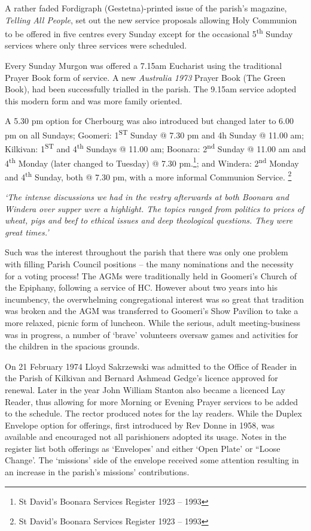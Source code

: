 A rather faded Fordigraph (Gestetna)-printed issue of the parish's magazine, \emph{Telling All People}, set out the new service proposals allowing Holy Communion to be offered in five centres every Sunday except for the occasional 5\textsuperscript{th} Sunday services where only three services were scheduled.

Every Sunday Murgon was offered a 7.15am Eucharist using the traditional Prayer Book form of service. A new \emph{Australia 1973} Prayer Book (The Green Book), had been successfully trialled in the parish. The 9.15am service adopted this modern form and was more family oriented.

A 5.30 pm option for Cherbourg was also introduced but changed later to 6.00 pm on all Sundays; Goomeri: 1\textsuperscript{ST} Sunday @ 7.30 pm and 4h Sunday @ 11.00 am; Kilkivan: 1\textsuperscript{ST} and 4\textsuperscript{th} Sundays @ 11.00 am; Boonara: 2\textsuperscript{nd} Sunday @ 11.00 am and 4\textsuperscript{th} Monday (later changed to Tuesday) @ 7.30 pm.\footnote{St David's Boonara Services Register 1923 -- 1993}; and Windera: 2\textsuperscript{nd} Monday and 4\textsuperscript{th} Sunday, both @ 7.30 pm, with a more informal Communion Service. \footnote{St David's Boonara Services Register 1923 -- 1993}

\emph{`The intense discussions we had in the vestry afterwards at both Boonara and Windera over supper were a highlight. The topics ranged from politics to prices of wheat, pigs and beef to ethical issues and deep theological questions. They were great times.'}

Such was the interest throughout the parish that there was only one problem with filling Parish Council positions -- the many nominations and the necessity for a voting process! The AGMs were traditionally held in Goomeri's Church of the Epiphany, following a service of HC. However about two years into his incumbency, the overwhelming congregational interest was so great that tradition was broken and the AGM was transferred to Goomeri's Show Pavilion to take a more relaxed, picnic form of luncheon. While the serious, adult meeting-business was in progress, a number of `brave' volunteers oversaw games and activities for the children in the spacious grounds.

On 21 February 1974 Lloyd Sakrzewski was admitted to the Office of Reader in the Parish of Kilkivan and Bernard Ashmead Gedge's licence approved for renewal. Later in the year John William Stanton also became a licenced Lay Reader, thus allowing for more Morning or Evening Prayer services to be added to the schedule. The rector produced notes for the lay readers. While the Duplex Envelope option for offerings, first introduced by Rev Donne in 1958, was available and encouraged not all parishioners adopted its usage. Notes in the register list both offerings as `Envelopes' and either `Open Plate' or ``Loose Change'. The `missions' side of the envelope received some attention resulting in an increase in the parish's missions' contributions.


